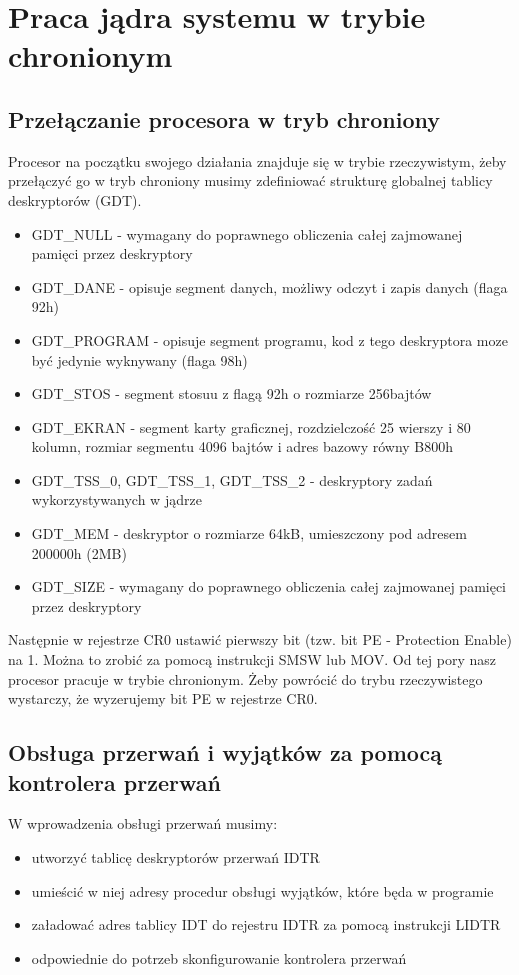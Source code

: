\documentclass[a4paper,12pt]{article}
\begin{document}
	\section{Praca jądra systemu w trybie chronionym}


	\subsection{Przełączanie procesora w tryb chroniony}
Procesor na początku swojego działania znajduje się w trybie rzeczywistym, żeby przełączyć go w tryb chroniony musimy zdefiniować strukturę globalnej tablicy deskryptorów (GDT).

\begin{itemize}
\item{GDT_NULL - wymagany do poprawnego obliczenia całej zajmowanej pamięci przez deskryptory}
\item{GDT_DANE - opisuje segment danych, możliwy odczyt i zapis danych (flaga 92h)}
\item{GDT_PROGRAM - opisuje segment programu, kod z tego deskryptora moze być jedynie wyknywany (flaga 98h)}
\item{GDT_STOS - segment stosuu z flagą 92h o rozmiarze 256bajtów}
\item{GDT_EKRAN - segment karty graficznej, rozdzielczość 25 wierszy i 80 kolumn, rozmiar segmentu 4096 bajtów i adres bazowy równy B800h}
\item{GDT_TSS_0, GDT_TSS_1, GDT_TSS_2 -  deskryptory zadań wykorzystywanych w jądrze}
\item{GDT_MEM - deskryptor o rozmiarze 64kB, umieszczony pod adresem 200000h (2MB)}
\item{GDT_SIZE - wymagany do poprawnego obliczenia całej zajmowanej pamięci przez deskryptory}

\end{itemize}

Następnie w rejestrze CR0 ustawić pierwszy bit (tzw. bit PE - Protection Enable) na 1. Można to zrobić za pomocą instrukcji SMSW lub MOV. Od tej pory nasz procesor pracuje w trybie chronionym. Żeby powrócić do trybu rzeczywistego wystarczy, że wyzerujemy bit PE w rejestrze CR0.

\subsection{Obsługa przerwań i wyjątków za pomocą kontrolera przerwań}
W wprowadzenia obsługi przerwań musimy:
\begin{itemize}
\item{utworzyć tablicę deskryptorów przerwań IDTR}
\item{umieścić w niej adresy procedur obsługi wyjątków, które będa w programie}
\item{załadować adres tablicy IDT do rejestru IDTR za pomocą instrukcji LIDTR}
\item{odpowiednie do potrzeb skonfigurowanie kontrolera przerwań}
\end{itemize}
\end{document}
